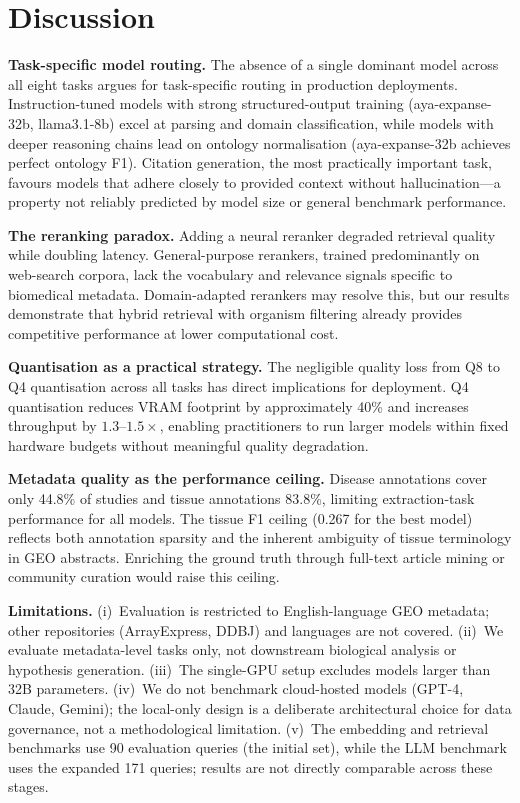 \documentclass[sn-nature]{sn-jnl}
\begin{document}
\section{Discussion}\label{sec:discussion}

\textbf{Task-specific model routing.} The absence of a single dominant model
across all eight tasks argues for task-specific routing in production
deployments. Instruction-tuned models with strong structured-output training
(aya-expanse-32b, llama3.1-8b) excel at parsing and domain classification,
while models with deeper reasoning chains lead on ontology normalisation
(aya-expanse-32b achieves perfect ontology F1). Citation generation, the most practically important task,
favours models that adhere closely to provided context without
hallucination---a property not reliably predicted by model size or general
benchmark performance.

\textbf{The reranking paradox.} Adding a neural reranker degraded retrieval
quality while doubling latency. General-purpose rerankers, trained
predominantly on web-search corpora, lack the vocabulary and relevance
signals specific to biomedical metadata. Domain-adapted rerankers may
resolve this, but our results demonstrate that hybrid retrieval with organism
filtering already provides competitive performance at lower computational
cost.

\textbf{Quantisation as a practical strategy.} The negligible quality loss
from Q8 to Q4 quantisation across all tasks has direct implications for
deployment. Q4 quantisation reduces VRAM footprint by approximately 40\%
and increases throughput by $1.3$--$1.5\times$, enabling practitioners to
run larger models within fixed hardware budgets without meaningful quality
degradation.

\textbf{Metadata quality as the performance ceiling.} Disease annotations
cover only 44.8\% of studies and tissue annotations 83.8\%, limiting
extraction-task performance for all models. The tissue F1 ceiling (0.267 for
the best model) reflects both annotation sparsity and the inherent ambiguity
of tissue terminology in GEO abstracts. Enriching the ground truth through
full-text article mining or community curation would raise this ceiling.

\textbf{Limitations.} (i)~Evaluation is restricted to English-language GEO
metadata; other repositories (ArrayExpress, DDBJ) and languages are not
covered. (ii)~We evaluate metadata-level tasks only, not downstream
biological analysis or hypothesis generation. (iii)~The single-GPU setup
excludes models larger than 32B parameters. (iv)~We do not benchmark
cloud-hosted models (GPT-4, Claude, Gemini); the local-only design is a
deliberate architectural choice for data governance, not a methodological
limitation. (v)~The embedding and retrieval benchmarks use 90 evaluation
queries (the initial set), while the LLM benchmark uses the expanded 171
queries; results are not directly comparable across these stages.
\end{document}
